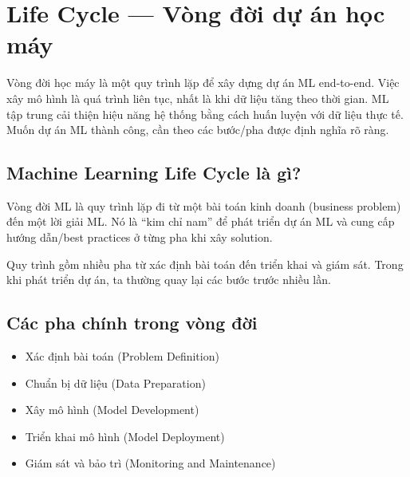 \section{Life Cycle --- Vòng đời dự án học máy}
\label{sec:vong-doi-ml}

\begin{dongco}[title={Vòng đời ML là quy trình lặp}]
Vòng đời học máy là một quy trình lặp để xây dựng dự án ML end-to-end.
Việc xây mô hình là quá trình liên tục, nhất là khi dữ liệu tăng theo thời gian.
ML tập trung cải thiện hiệu năng hệ thống bằng cách huấn luyện với dữ liệu thực tế.
Muốn dự án ML thành công, cần theo các bước/pha được định nghĩa rõ ràng.
\end{dongco}

\subsection{Machine Learning Life Cycle là gì?}

\begin{dinhnghia}[title={Định nghĩa}]
Vòng đời ML là quy trình lặp đi từ một bài toán kinh doanh (business problem) đến một lời giải ML.
Nó là “kim chỉ nam” để phát triển dự án ML và cung cấp hướng dẫn/best practices ở từng pha khi xây solution.
\end{dinhnghia}

\begin{ynghia}[title={Đặc trưng của vòng đời}]
Quy trình gồm nhiều pha từ xác định bài toán đến triển khai và giám sát.
Trong khi phát triển dự án, ta thường quay lại các bước trước nhiều lần.
\end{ynghia}

\subsection{Các pha chính trong vòng đời}

\begin{phuongphap}[title={Danh sách pha}]
\begin{itemize}
  \item Xác định bài toán (Problem Definition)
  \item Chuẩn bị dữ liệu (Data Preparation)
  \item Xây mô hình (Model Development)
  \item Triển khai mô hình (Model Deployment)
  \item Giám sát và bảo trì (Monitoring and Maintenance)
\end{itemize}
\end{phuongphap}

